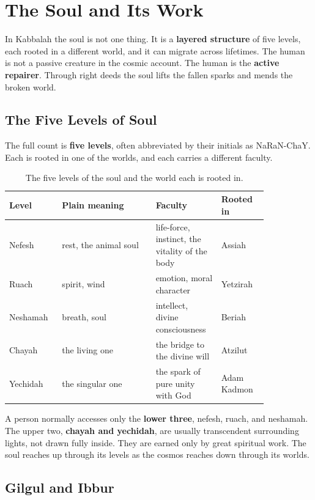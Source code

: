 \section{The Soul and Its Work}

In Kabbalah the soul is not one thing. It is a \textbf{layered structure} of five
levels, each rooted in a different world, and it can migrate across lifetimes. The
human is not a passive creature in the cosmic account. The human is the
\textbf{active repairer}. Through right deeds the soul lifts the fallen sparks and
mends the broken world.

\subsection{The Five Levels of Soul}

The full count is \textbf{five levels}, often abbreviated by their initials as
NaRaN-ChaY. Each is rooted in one of the worlds, and each carries a different
faculty.

\begin{longtable}{L{0.16\linewidth} L{0.32\linewidth} L{0.20\linewidth} L{0.16\linewidth}}
\caption{The five levels of the soul and the world each is rooted in.}\\
\toprule
\textbf{Level} & \textbf{Plain meaning} & \textbf{Faculty} & \textbf{Rooted in} \\
\midrule
Nefesh & rest, the animal soul & life-force, instinct, the vitality of the body & Assiah \\
Ruach & spirit, wind & emotion, moral character & Yetzirah \\
Neshamah & breath, soul & intellect, divine consciousness & Beriah \\
Chayah & the living one & the bridge to the divine will & Atzilut \\
Yechidah & the singular one & the spark of pure unity with God & Adam Kadmon \\
\bottomrule
\end{longtable}

A person normally accesses only the \textbf{lower three}, nefesh, ruach, and
neshamah. The upper two, \textbf{chayah and yechidah}, are usually transcendent
surrounding lights, not drawn fully inside. They are earned only by great
spiritual work. The soul reaches up through its levels as the cosmos reaches down
through its worlds.

\subsection{Gilgul and Ibbur}

